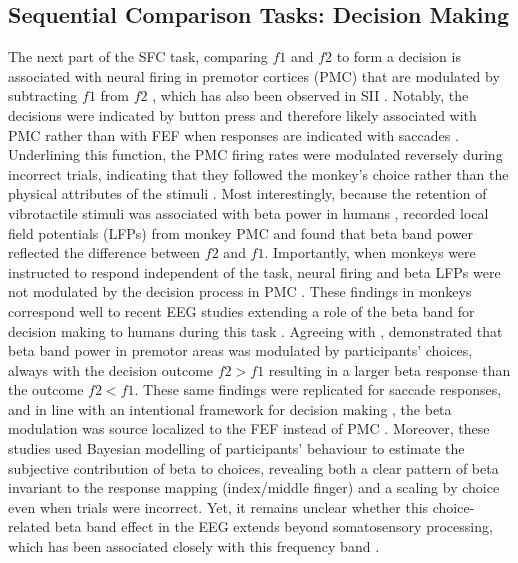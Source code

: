 \subsection{Sequential Comparison Tasks: Decision Making}
The next part of the SFC task, comparing $f1$ and $f2$ to form a decision is associated with neural firing in premotor cortices (PMC) that are modulated by subtracting $f1$ from $f2$ \parencite{Hernandez2010,Hernandez2002,Jun2010,Romo2004}, which has also been observed in SII \parencite{Romo2002}. Notably, the decisions were indicated by button press and therefore likely associated with PMC rather than with FEF when responses are indicated with saccades \parencite[see also][]{Gold2007}. Underlining this function, the PMC firing rates were modulated reversely during incorrect trials, indicating that they followed the monkey’s choice rather than the physical attributes of the stimuli \parencite{Hernandez2002,Romo2004}. Most interestingly, because the retention of vibrotactile stimuli was associated with beta power in humans \parencite{Spitzer2010}, \textcite{Haegens2011} recorded local field potentials (LFPs) from monkey PMC and found that beta band power reflected the difference between $f2$ and $f1$. Importantly, when monkeys were instructed to respond independent of the task, neural firing and beta LFPs were not modulated by the decision process in PMC \parencite[see also][]{Haegens2017}. These findings in monkeys correspond well to recent EEG studies extending a role of the beta band for decision making to humans during this task \parencite{Herding2016,Herding2017}. Agreeing with \textcite{Haegens2011}, \textcite{Herding2016} demonstrated that beta band power in premotor areas was modulated by participants’ choices, always with the decision outcome $f2>f1$ resulting in a larger beta response than the outcome $f2<f1$. These same findings were replicated for saccade responses, and in line with an intentional framework for decision making \parencite{Shadlen2008}, the beta modulation was source localized to the FEF instead of PMC \parencite{Herding2017}. Moreover, these studies used Bayesian modelling of participants’ behaviour to estimate the subjective contribution of beta to choices, revealing both a clear pattern of beta invariant to the response mapping (index/middle finger) and a scaling by choice even when trials were incorrect. Yet, it remains unclear whether this choice-related beta band effect in the EEG extends beyond somatosensory processing, which has been associated closely with this frequency band \parencite{Pfurtscheller1981}. 
